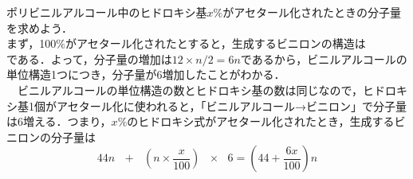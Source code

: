 \documentclass[a4paper,12pt]{ltjsarticle}
\title{}
\author{}
\date{}
\begin{document}
\pagestyle{empty}
ポリビニルアルコール中のヒドロキシ基$x\%$がアセタール化されたときの分子量を求めよう．\\[5cm]まず，100$\%$がアセタール化されたとすると，生成するビニロンの構造は\\[5cm]
である．よって，分子量の増加は$12\times n/2=6n$であるから，ビニルアルコールの単位構造1つにつき，分子量が6増加したことがわかる．\\
　ビニルアルコールの単位構造の数とヒドロキシ基の数は同じなので，ヒドロキシ基1個がアセタール化に使われると，「ビニルアルコール→ビニロン」で分子量は6増える．つまり，$x\%$のヒドロキシ式がアセタール化されたとき，生成するビニロンの分子量は
\[44n~~~+~~~\left(n\times \frac{x}{100}\right)~~~\times~~~ 6=\left(44+\frac{6x}{100}\right)n\]
\end{document}
